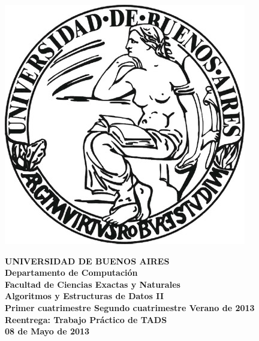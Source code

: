 
\def\Materia{Algoritmos y Estructuras de Datos II}
\def\cuatrimestre{1}
\def\elanio{2013}
\def\Titulo{\LARGE Reentrega: Trabajo Pr\'actico de TADS}
\def\Fecha{08 de Mayo de 2013}

\newcommand{\cuatrimestreLindo}{
  \ifthenelse{\equal{\cuatrimestre}{1}}
  {Primer cuatrimestre}
  {\ifthenelse{\equal{\cuatrimestre}{2}}
  {Segundo cuatrimestre}
  {Verano}}
}


\thispagestyle{empty}

\begin{center}
	\includegraphics[scale = 0.25]{imagenes/logo_uba.jpg}
\end{center}

\vspace{5mm}

\begin{center}
	{\textbf{\large UNIVERSIDAD DE BUENOS AIRES}}\\[1.5em]
	{\textbf{\large Departamento de Computaci\'{o}n}}\\[1.5em]
    {\textbf{\large Facultad de Ciencias Exactas y Naturales}}\\
    \vspace{20mm}
    {\LARGE\textbf{\Materia}}\\[1em]    
    \vspace{5mm}
    {\LARGE\textbf{\cuatrimestreLindo de \elanio}}\\
    \vspace{15mm}
    {\Large \textbf{\Titulo}}\\[1em]
    \vspace{15mm}
    {\textbf{\Large \Fecha}}\\
    \vspace{15mm}
    \textbf{\tablaints}
\end{center}

